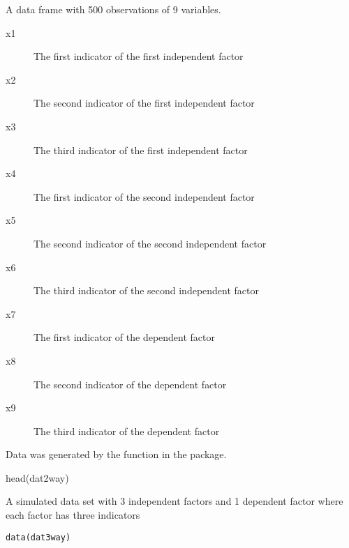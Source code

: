 \documentclass[a4paper]{book}
\begin{document}
\begin{Format}
A data frame with 500 observations of 9 variables.
\begin{description}

\item[x1] The first indicator of the first independent factor
\item[x2] The second indicator of the first independent factor
\item[x3] The third indicator of the first independent factor
\item[x4] The first indicator of the second independent factor
\item[x5] The second indicator of the second independent factor
\item[x6] The third indicator of the second independent factor
\item[x7] The first indicator of the dependent factor
\item[x8] The second indicator of the dependent factor
\item[x9] The third indicator of the dependent factor

\end{description}

\end{Format}
%
\begin{Source}\relax
Data was generated by the  function in the  package.
\end{Source}
%
\begin{Examples}
\begin{ExampleCode}
head(dat2way)
\end{ExampleCode}
\end{Examples}
%
\begin{Description}\relax
A simulated data set with 3 independent factors and 1 dependent factor where each factor has three indicators 
\end{Description}
%
\begin{Usage}
\begin{verbatim}
data(dat3way)
\end{verbatim}
\end{Usage}
%
\end{document}
